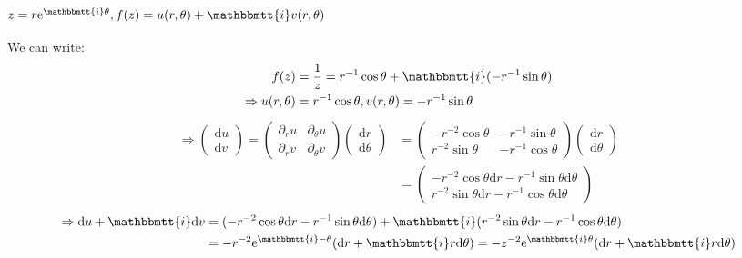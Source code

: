 \documentclass[]{ctexart}
\newcommand{\mi}{\mathbbmtt{i}}
\newcommand{\di}{\mathrm{d}}
\newcommand{\pa}{\partial}
\newcommand{\me}{\mathrm{e}}
\begin{document}
		\subsubsection{$z=r\me ^{\mi \theta},f(z)=u(r,\theta)+\mi v(r,\theta)$}
			We can write:
				\begin{equation*}
				\begin{aligned}
					f(z)&=\frac{1}{z}=r^{-1}\cos\theta+\mi (-r^{-1}\sin\theta)\\
					\Rightarrow u(r,\theta)&=r^{-1}\cos\theta,v(r,\theta)=-r^{-1}\sin\theta
				\end{aligned}
				\end{equation*}
				\begin{equation*}
				\begin{aligned}
					\Rightarrow 
					\begin{pmatrix}
					\di u\\
					\di v
					\end{pmatrix}
					=
					\begin{pmatrix}
					\pa_ru & \pa_{\theta}u\\
					\pa_rv & \pa_{\theta}v
					\end{pmatrix}
					\begin{pmatrix}
					\di r\\
					\di \theta
					\end{pmatrix}
					&=
					\begin{pmatrix}
					-r^{-2}\cos \theta & -r^{-1}\sin \theta\\
					r^{-2}\sin \theta & -r^{-1}\cos \theta
					\end{pmatrix}
					\begin{pmatrix}
					\di r\\
					\di \theta
					\end{pmatrix}\\
					&=
					\begin{pmatrix}
					-r^{-2}\cos \theta \di r -r^{-1}\sin \theta\di \theta\\
					r^{-2}\sin \theta \di r  -r^{-1}\cos \theta\di \theta
					\end{pmatrix}
				\end{aligned}
				\end{equation*}
				\begin{equation*}
				\begin{aligned}
					\Rightarrow \di u+\mi \di v&=(-r^{-2}\cos \theta \di r -r^{-1}\sin \theta\di \theta)+\mi (r^{-2}\sin \theta \di r  -r^{-1}\cos \theta\di \theta)\\
					&=-r^{-2}\me ^{\mi-\theta}(\di r +\mi r\di \theta)=-z^{-2}\me ^{\mi\theta}(\di r +\mi r\di \theta)
				\end{aligned}
				\end{equation*}
				
\end{document}
